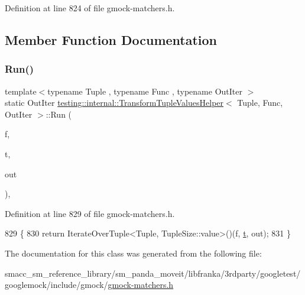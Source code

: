 Definition at line 824 of file gmock-\/matchers.\+h.



\subsection{Member Function Documentation}
\mbox{\label{classtesting_1_1internal_1_1TransformTupleValuesHelper_a27773f284f43c712ec72923a872d35fc}} 
\subsubsection{\texorpdfstring{Run()}{Run()}}
{\footnotesize\ttfamily template$<$typename Tuple , typename Func , typename Out\+Iter $>$ \\
static Out\+Iter \hyperlink{classtesting_1_1internal_1_1TransformTupleValuesHelper}{testing\+::internal\+::\+Transform\+Tuple\+Values\+Helper}$<$ Tuple, Func, Out\+Iter $>$\+::Run (\begin{DoxyParamCaption}\item[{Func}]{f,  }\item[{const Tuple \&}]{t,  }\item[{Out\+Iter}]{out }\end{DoxyParamCaption})\hspace{0.3cm}{\ttfamily [inline]}, {\ttfamily [static]}}



Definition at line 829 of file gmock-\/matchers.\+h.


\begin{DoxyCode}
829                                                           \{
830     \textcolor{keywordflow}{return} IterateOverTuple<Tuple, TupleSize::value>()(f, \hyperlink{namespacebattery__monitor__node_a7a63d20d1ea461e280f4eb5b47f925cd}{t}, out);
831   \}
\end{DoxyCode}


The documentation for this class was generated from the following file\+:\begin{DoxyCompactItemize}
\item 
smacc\+\_\+sm\+\_\+reference\+\_\+library/sm\+\_\+panda\+\_\+moveit/libfranka/3rdparty/googletest/googlemock/include/gmock/\hyperlink{gmock-matchers_8h}{gmock-\/matchers.\+h}\end{DoxyCompactItemize}

